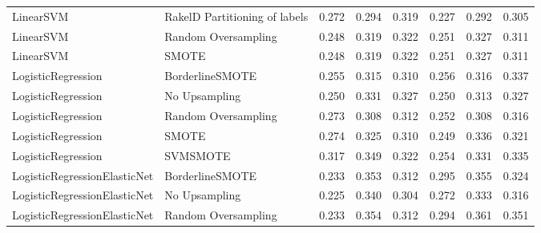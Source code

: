 \begin{tabular}{llllllll}
                      LinearSVM & RakelD Partitioning of labels & 0.272 &                     0.294 &                 0.319 &                  0.227 &                                   0.292 &     0.305 \\
                      LinearSVM &           Random Oversampling & 0.248 &                     0.319 &                 0.322 &                  0.251 &                                   0.327 &     0.311 \\
                      LinearSVM &                         SMOTE & 0.248 &                     0.319 &                 0.322 &                  0.251 &                                   0.327 &     0.311 \\
             LogisticRegression &               BorderlineSMOTE & 0.255 &                     0.315 &                 0.310 &                  0.256 &                                   0.316 &     0.337 \\
             LogisticRegression &                 No Upsampling & 0.250 &                     0.331 &                 0.327 &                  0.250 &                                   0.313 &     0.327 \\
             LogisticRegression &           Random Oversampling & 0.273 &                     0.308 &                 0.312 &                  0.252 &                                   0.308 &     0.316 \\
             LogisticRegression &                         SMOTE & 0.274 &                     0.325 &                 0.310 &                  0.249 &                                   0.336 &     0.321 \\
             LogisticRegression &                      SVMSMOTE & 0.317 &                     0.349 &                 0.322 &                  0.254 &                                   0.331 &     0.335 \\
   LogisticRegressionElasticNet &               BorderlineSMOTE & 0.233 &                     0.353 &                 0.312 &                  0.295 &                                   0.355 &     0.324 \\
   LogisticRegressionElasticNet &                 No Upsampling & 0.225 &                     0.340 &                 0.304 &                  0.272 &                                   0.333 &     0.316 \\
   LogisticRegressionElasticNet &           Random Oversampling & 0.233 &                     0.354 &                 0.312 &                  0.294 &                                   0.361 &     0.351 \\

\end{tabular}
